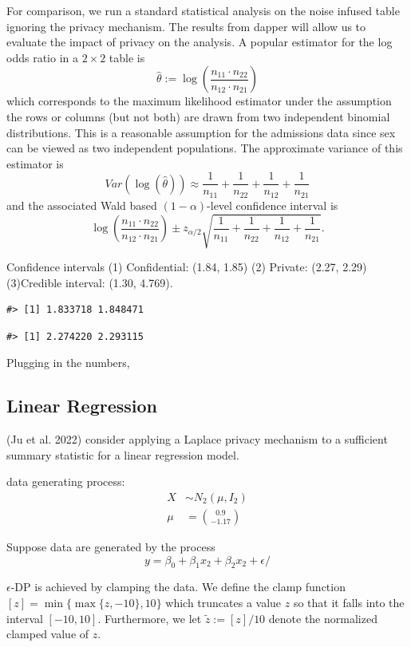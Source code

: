 For comparison, we run a standard statistical analysis
on the noise infused table ignoring the privacy mechanism. The results from dapper
will allow us to evaluate the impact of privacy on the analysis. A popular estimator for the log odds ratio
in a \(2 \times 2\) table is
\[
\hat{\theta} := \log\left(\dfrac{n_{11} \cdot n_{22}}{n_{12} \cdot n_{21}}\right) 
\]
which corresponds to the maximum likelihood estimator under the assumption
the rows or columns (but not both) are drawn from two independent binomial distributions.
This is a reasonable assumption for the admissions data since sex can be viewed
as two independent populations. The approximate variance of this estimator is
\[
Var(\log(\hat{\theta})) \approx \dfrac{1}{n_{11}} + \dfrac{1}{n_{22}} + \dfrac{1}{n_{12}} + \dfrac{1}{n_{21}}
\]
and the associated Wald based \((1-\alpha)\)-level confidence interval is
\[
\log\left(\dfrac{n_{11} \cdot n_{22}}{n_{12} \cdot n_{21}}\right) 
  \pm z_{\alpha/2}\sqrt{\dfrac{1}{n_{11}} + \dfrac{1}{n_{22}} + \dfrac{1}{n_{12}} + \dfrac{1}{n_{21}}}.
\]

Confidence intervals (1) Confidential: (1.84, 1.85) (2) Private: (2.27, 2.29)
(3)Credible interval: (1.30, 4.769).

\begin{verbatim}
#> [1] 1.833718 1.848471
\end{verbatim}

\begin{verbatim}
#> [1] 2.274220 2.293115
\end{verbatim}

Plugging in the numbers,

\hypertarget{linear-regression}{%
\subsection{Linear Regression}\label{linear-regression}}

(Ju et al. 2022) consider applying a Laplace privacy
mechanism to a sufficient summary statistic for a linear regression model.

data generating process:
\[
\begin{split}
X &\sim N_{2}(\mu, I_2)\\
\mu &= \binom{0.9}{-1.17}
\end{split}
\]

Suppose data are generated by the process
\[
y = \beta_0 + \beta_1x_2 + \beta_2x_2 + \epsilon/
\]

\(\epsilon\)-DP is achieved by clamping the data. We define
the clamp function \([z] = \min\{\max\{z,-10\}, 10\}\) which truncates a value
\(z\) so that it falls into the interval \([-10,10]\). Furthermore, we let \(\tilde{z} := [z]/10\)
denote the normalized clamped value of \(z\).

